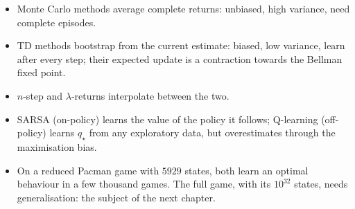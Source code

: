 \begin{itemize}[nosep]
  \item Monte Carlo methods average complete returns: unbiased, high
    variance, need complete episodes.
  \item TD methods bootstrap from the current estimate: biased, low
    variance, learn after every step; their expected update is a
    contraction towards the Bellman fixed point.
  \item $n$-step and $\lambda$-returns interpolate between the two.
  \item SARSA (on-policy) learns the value of the policy it follows;
    Q-learning (off-policy) learns $q_\star$ from any exploratory data,
    but overestimates through the maximisation bias.
  \item On a reduced Pacman game with $5929$ states, both learn an
    optimal behaviour in a few thousand games. The full game, with its
    $10^{32}$ states, needs generalisation: the subject of the next
    chapter.
\end{itemize}
